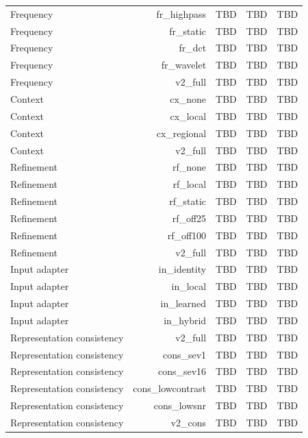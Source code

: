 \begin{table}[t]
\begin{tabular}{lrrrr}
Frequency & fr_highpass & TBD & TBD & TBD \\
Frequency & fr_static & TBD & TBD & TBD \\
Frequency & fr_dct & TBD & TBD & TBD \\
Frequency & fr_wavelet & TBD & TBD & TBD \\
Frequency & v2_full & TBD & TBD & TBD \\
Context & cx_none & TBD & TBD & TBD \\
Context & cx_local & TBD & TBD & TBD \\
Context & cx_regional & TBD & TBD & TBD \\
Context & v2_full & TBD & TBD & TBD \\
Refinement & rf_none & TBD & TBD & TBD \\
Refinement & rf_local & TBD & TBD & TBD \\
Refinement & rf_static & TBD & TBD & TBD \\
Refinement & rf_off25 & TBD & TBD & TBD \\
Refinement & rf_off100 & TBD & TBD & TBD \\
Refinement & v2_full & TBD & TBD & TBD \\
Input adapter & in_identity & TBD & TBD & TBD \\
Input adapter & in_local & TBD & TBD & TBD \\
Input adapter & in_learned & TBD & TBD & TBD \\
Input adapter & in_hybrid & TBD & TBD & TBD \\
Representation consistency & v2_full & TBD & TBD & TBD \\
Representation consistency & cons_sev1 & TBD & TBD & TBD \\
Representation consistency & cons_sev16 & TBD & TBD & TBD \\
Representation consistency & cons_lowcontrast & TBD & TBD & TBD \\
Representation consistency & cons_lowsnr & TBD & TBD & TBD \\
Representation consistency & v2_cons & TBD & TBD & TBD \\
\bottomrule
\end{tabular}
\end{table}
